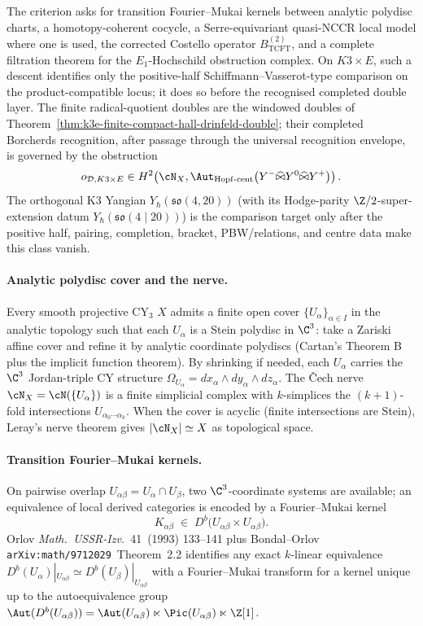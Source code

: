 The criterion asks for transition Fourier--Mukai kernels between
analytic polydisc charts, a homotopy-coherent cocycle, a
Serre-equivariant quasi-NCCR local model where one is used, the
corrected Costello operator \(B_{\mathrm{TCFT}}^{(2)}\), and a complete
filtration theorem for the \(E_1\)-Hochschild obstruction complex. On
$K3\times E$, such a descent identifies only the positive-half
Schiffmann--Vasserot-type comparison on the product-compatible locus;
it does so before the recognised completed double layer. The finite
radical-quotient doubles are the windowed doubles of
Theorem~\ref{thm:k3e-finite-compact-hall-drinfeld-double}; their
completed Borcherds recognition, after passage through the universal
recognition envelope, is governed by the obstruction
\[
 o_{\mathcal D,K3\times E}\in
 H^2\!\left(\cN_X,
 \Aut_{\mathrm{Hopf}\text{-}\mathrm{cent}}
 \bigl(Y^{-}\widehat\bowtie Y^0\widehat\bowtie Y^+\bigr)\right).
\]
The orthogonal K$3$ Yangian $Y_\hbar(\mathfrak{so}(4, 20))$ (with its
Hodge-parity $\Z/2$-super-extension datum
\(Y_\hbar(\mathfrak{so}(4 \mid 20))\)) is the comparison target only
after the positive half, pairing, completion, bracket, PBW/relations,
and centre data make this class vanish.

\paragraph{Analytic polydisc cover and the nerve.} Every smooth
projective CY$_{3}$ $X$ admits a finite open cover
$\{U_{\alpha}\}_{\alpha\in I}$ in the analytic topology such that each
$U_{\alpha}$ is a Stein polydisc in $\C^{3}$: take a Zariski affine
cover and refine it by analytic coordinate polydiscs (Cartan's
Theorem B plus the implicit function theorem). By shrinking
if needed, each $U_{\alpha}$ carries the $\C^{3}$ Jordan-triple CY
structure $\Omega_{U_{\alpha}}=dx_{\alpha}\wedge dy_{\alpha}\wedge
dz_{\alpha}$. The \v{C}ech nerve $\cN_{X}=\cN(\{U_{\alpha}\})$ is a
finite simplicial complex with $k$-simplices the
$(k+1)$-fold intersections $U_{\alpha_{0}\cdots\alpha_{k}}$. When the
cover is acyclic (finite intersections are Stein), Leray's nerve
theorem gives $|\cN_{X}|\simeq X$ as topological space.

\paragraph{Transition Fourier--Mukai kernels.} On pairwise overlap
$U_{\alpha\beta}=U_{\alpha}\cap U_{\beta}$, two $\C^{3}$-coordinate
systems are available; an equivalence of local derived categories is
encoded by a Fourier--Mukai kernel
\[
K_{\alpha\beta}\;\in\; D^{b}\bigl(U_{\alpha\beta}\times
U_{\alpha\beta}\bigr).
\]
Orlov \emph{Math.~USSR-Izv.}~41~(1993) 133--141 plus Bondal--Orlov
\texttt{arXiv:math/9712029}~Theorem~2.2 identifies any exact
$k$-linear equivalence $D^{b}(U_{\alpha})|_{U_{\alpha\beta}}\simeq
D^{b}(U_{\beta})|_{U_{\alpha\beta}}$ with a Fourier--Mukai transform
for a kernel unique up to the autoequivalence group
$\Aut(D^{b}(U_{\alpha\beta}))=\Aut(U_{\alpha\beta})\ltimes
\Pic(U_{\alpha\beta})\ltimes\Z[1]$.

